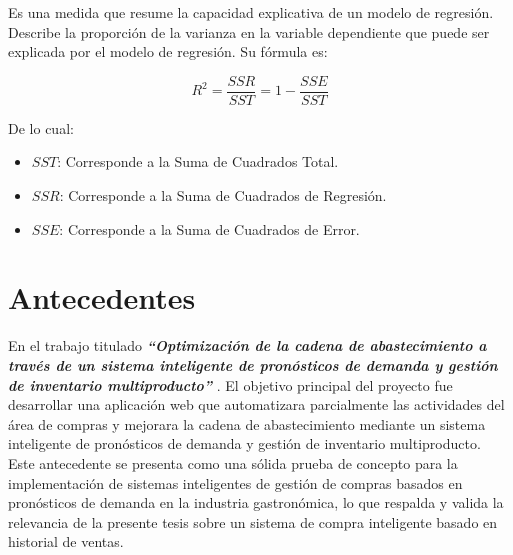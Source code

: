 Es una medida que resume la capacidad explicativa de un modelo de regresión.
Describe la proporción de la varianza en la variable dependiente que puede ser
explicada por el modelo de regresión\cite{chang2023comparacion}. Su fórmula es:

\[
  R^2 = \frac{SSR}{SST} = 1 - \frac{SSE}{SST}
\]

De lo cual:
\begin{itemize}
  \item \(SST\): Corresponde a la Suma de Cuadrados Total.
  \item \(SSR\): Corresponde a la Suma de Cuadrados de Regresión.
  \item \(SSE\): Corresponde a la Suma de Cuadrados de Error.
\end{itemize}






\section{Antecedentes}

En el trabajo titulado\textbf{\textit{ “Optimización de la cadena de abastecimiento a través de un sistema inteligente de pronósticos de demanda y gestión de inventario multiproducto”}} \cite{pacheco2015rediseno}. El objetivo principal del proyecto fue desarrollar una aplicación web que
automatizara parcialmente las actividades del área de compras y mejorara la
cadena de abastecimiento mediante un sistema inteligente de pronósticos de
demanda y gestión de inventario multiproducto. Este antecedente se presenta
como una sólida prueba de concepto para la implementación de sistemas
inteligentes de gestión de compras basados en pronósticos de demanda en la
industria gastronómica, lo que respalda y valida la relevancia de la presente
tesis sobre un sistema de compra inteligente basado en historial de ventas.

